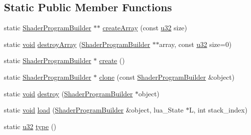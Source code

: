 \subsection*{Static Public Member Functions}
\begin{DoxyCompactItemize}
\item 
static \mbox{\hyperlink{classnjli_1_1_shader_program_builder}{Shader\+Program\+Builder}} $\ast$$\ast$ \mbox{\hyperlink{classnjli_1_1_shader_program_builder_a7ad4dfdff810f39a5d9ea199706527ac}{create\+Array}} (const \mbox{\hyperlink{_util_8h_a10e94b422ef0c20dcdec20d31a1f5049}{u32}} size)
\item 
static \mbox{\hyperlink{_thread_8h_af1e856da2e658414cb2456cb6f7ebc66}{void}} \mbox{\hyperlink{classnjli_1_1_shader_program_builder_ab5b9f90e9cfbe7bc84cce9cead9c03a8}{destroy\+Array}} (\mbox{\hyperlink{classnjli_1_1_shader_program_builder}{Shader\+Program\+Builder}} $\ast$$\ast$array, const \mbox{\hyperlink{_util_8h_a10e94b422ef0c20dcdec20d31a1f5049}{u32}} size=0)
\item 
static \mbox{\hyperlink{classnjli_1_1_shader_program_builder}{Shader\+Program\+Builder}} $\ast$ \mbox{\hyperlink{classnjli_1_1_shader_program_builder_a29db7e71179718d1d22c76b4cd3db023}{create}} ()
\item 
static \mbox{\hyperlink{classnjli_1_1_shader_program_builder}{Shader\+Program\+Builder}} $\ast$ \mbox{\hyperlink{classnjli_1_1_shader_program_builder_a539760d31d54d1c95c2fffc4c3fc3fbb}{clone}} (const \mbox{\hyperlink{classnjli_1_1_shader_program_builder}{Shader\+Program\+Builder}} \&object)
\item 
static \mbox{\hyperlink{_thread_8h_af1e856da2e658414cb2456cb6f7ebc66}{void}} \mbox{\hyperlink{classnjli_1_1_shader_program_builder_a9cabb0fb024d57b344c3c62e81c0e950}{destroy}} (\mbox{\hyperlink{classnjli_1_1_shader_program_builder}{Shader\+Program\+Builder}} $\ast$object)
\item 
static \mbox{\hyperlink{_thread_8h_af1e856da2e658414cb2456cb6f7ebc66}{void}} \mbox{\hyperlink{classnjli_1_1_shader_program_builder_a5e440bc4611023d1350b958ee2077fe5}{load}} (\mbox{\hyperlink{classnjli_1_1_shader_program_builder}{Shader\+Program\+Builder}} \&object, lua\+\_\+\+State $\ast$L, int stack\+\_\+index)
\item 
static \mbox{\hyperlink{_util_8h_a10e94b422ef0c20dcdec20d31a1f5049}{u32}} \mbox{\hyperlink{classnjli_1_1_shader_program_builder_af7c6be5d68fae216af430dba56f249f9}{type}} ()
\end{DoxyCompactItemize}
